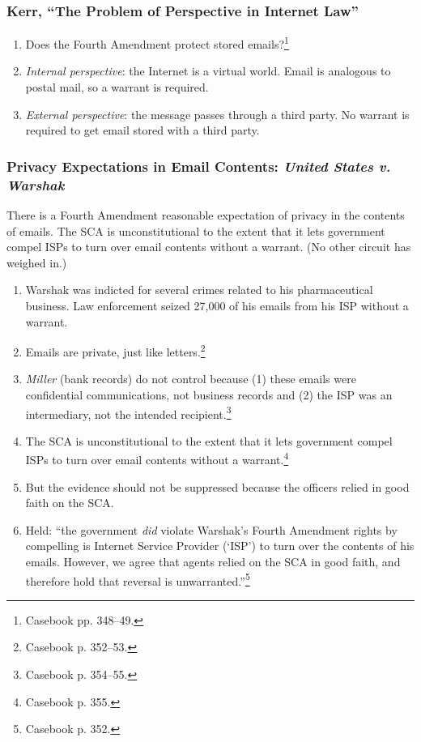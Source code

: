 \subsubsection{Kerr, ``The Problem of Perspective in Internet Law''}

\begin{enumerate}
    \item Does the Fourth Amendment protect stored emails?\footnote{Casebook 
    pp. 348--49.}
    \item \emph{Internal perspective}: the Internet is a virtual world. Email 
    is analogous to postal mail, so a warrant is required.
    \item \emph{External perspective}: the message passes through a third 
    party. No warrant is required to get email stored with a third party.
\end{enumerate}


\subsubsection{Privacy Expectations in Email Contents: \emph{United States v. 
Warshak}}

There is a Fourth Amendment reasonable expectation of privacy in the contents 
of emails. The SCA is unconstitutional to the extent that it lets government 
compel ISPs to turn over email contents without a warrant. (No other circuit 
has weighed in.)

\begin{enumerate}
    \item Warshak was indicted for several crimes related to his 
    pharmaceutical business. Law enforcement seized 27,000 of his emails from 
    his ISP without a warrant.
    \item Emails are private, just like letters.\footnote{Casebook p. 352--53.}
    \item \emph{Miller} (bank records) do not control because (1) these emails 
    were confidential communications, not business records and (2) the ISP was 
    an intermediary, not the intended recipient.\footnote{Casebook p. 354--55.}
    \item The SCA is unconstitutional to the extent that it lets government 
    compel ISPs to turn over email contents without a 
    warrant.\footnote{Casebook p. 355.}
    \item But the evidence should not be suppressed because the officers 
    relied in good faith on the SCA.
    \item Held: ``the government \emph{did} violate Warshak's Fourth Amendment 
    rights by compelling is Internet Service Provider (`ISP') to turn over the 
    contents of his emails. However, we agree that agents relied on the SCA in 
    good faith, and therefore hold that reversal is 
    unwarranted.''\footnote{Casebook p. 352.}
\end{enumerate}

